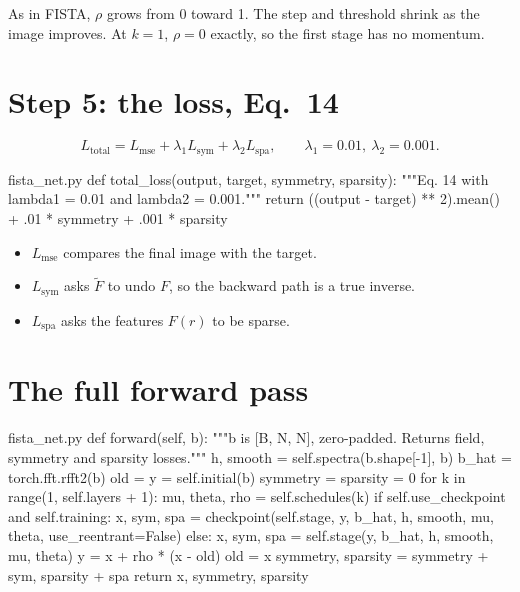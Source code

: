 As in FISTA, $\rho$ grows from 0 toward 1. The step and threshold shrink as the image improves. At $k=1$, $\rho=0$
exactly, so the first stage has no momentum.

\section{Step 5: the loss, Eq.~14}

\begin{equation}
L_{\text{total}} = L_{\text{mse}} + \lambda_1 L_{\text{sym}} + \lambda_2 L_{\text{spa}},
\qquad \lambda_1=0.01,\ \lambda_2=0.001 . \tag{Eq.~14}
\end{equation}

\begin{code*}{fista_net.py}
def total_loss(output, target, symmetry, sparsity):
    """Eq. 14 with lambda1 = 0.01 and lambda2 = 0.001."""
    return ((output - target) ** 2).mean() + .01 * symmetry + .001 * sparsity
\end{code*}

\begin{itemize}
\item $L_{\text{mse}}$ compares the final image with the target.
\item $L_{\text{sym}}$ asks $\tilde F$ to undo $F$, so the backward path is a true inverse.
\item $L_{\text{spa}}$ asks the features $F(r)$ to be sparse.
\end{itemize}

\section{The full forward pass}

\begin{code*}{fista_net.py}
    def forward(self, b):
        """b is [B, N, N], zero-padded. Returns field, symmetry and sparsity losses."""
        h, smooth = self.spectra(b.shape[-1], b)
        b_hat = torch.fft.rfft2(b)
        old = y = self.initial(b)
        symmetry = sparsity = 0
        for k in range(1, self.layers + 1):
            mu, theta, rho = self.schedules(k)
            if self.use_checkpoint and self.training:
                x, sym, spa = checkpoint(self.stage, y, b_hat, h, smooth, mu, theta,
                                         use_reentrant=False)
            else:
                x, sym, spa = self.stage(y, b_hat, h, smooth, mu, theta)
            y = x + rho * (x - old)
            old = x
            symmetry, sparsity = symmetry + sym, sparsity + spa
        return x, symmetry, sparsity
\end{code*}


